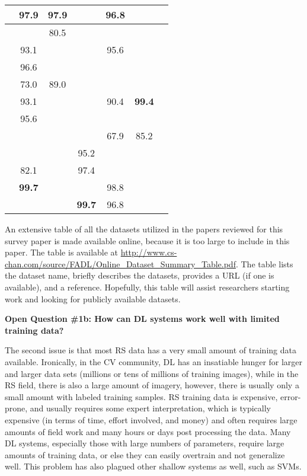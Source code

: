 \documentclass[12pt]{spieman}
\newcommand{\ParSection}[1]{}
\begin{document}
\begin{spacing}{1}
\begin{table}[ht]
\begin{tabular}{|c|c|c|c|c|c|c|}
\cite{Pan2017RVCANet} & 97.9 & 97.9 &  & 96.8 &  &  \\ \hline
\cite{Rajan2008Active} &  & 80.5 &  &  &  &  \\ \hline
\cite{ran2016bands} & 93.1 &  &  & 95.6 &  &  \\ \hline
\cite{slavkovikj2015hyperspectral} & 96.6 &  &  &  &  &  \\ \hline
\cite{Sun2016Active} & 73.0 & 89.0 &  &  &  &  \\ \hline
\cite{Wang2015Semisupervised} & 93.1 &  &  & 90.4 & \textbf{99.4} &  \\ \hline
\cite{Yang2016Two} & 95.6 &  &  &  &  &  \\ \hline
\cite{yue2016deep} &  &  &  & 67.9 & 85.2 &  \\ \hline
\cite{yue2015spectral} &  &  & 95.2 &  &  &  \\ \hline
\cite{Zabalza2016Novel} & 82.1 &  & 97.4 &  &  &  \\ \hline
\cite{zhang2017spectral} & \textbf{99.7} &  &  & 98.8 &  &  \\ \hline
\cite{Zhao2016Learning} &  &  & \textbf{99.7} & 96.8 &  & \\ \hline
\end{tabular}
\end{table}

An extensive table of all the datasets utilized in the papers reviewed for this survey paper is made available online, because it is too large to include in this paper. The table is available at \url{http://www.cs-chan.com/source/FADL/Online_Dataset_Summary_Table.pdf}. The table lists the dataset name, briefly describes the datasets, provides a URL (if one is available), and a reference. Hopefully, this table will assist researchers starting work and looking for publicly available datasets.

\textbf{Open Question \#1b: How can DL systems work well with limited training data?}

\ParSection{Small training available}
The second issue is that most RS data has a very small amount of training data available. Ironically, in the CV community, DL has an insatiable hunger for larger and larger data sets (millions or tens of millions of training images), while in the RS field, there is also a large amount of imagery, however, there is usually only a small amount with labeled training samples. RS training data is expensive, error-prone, and usually requires some expert interpretation, which is typically expensive (in terms of time, effort involved, and money) and often requires large amounts of field work and many hours or days post processing the data. Many DL systems, especially those with large numbers of parameters, require large amounts of training data, or else they can easily overtrain and not generalize well. This problem has also plagued other shallow systems as well, such as SVMs.


\end{spacing}
\end{document}
